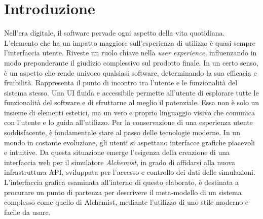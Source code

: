 \chapter{Introduzione}\label{chap:introduction}
Nell'era digitale, il software pervade ogni aspetto della vita quotidiana. L'elemento che ha un impatto maggiore sull'esperienza di utilizzo è quasi sempre l'interfaccia utente. Riveste un ruolo chiave nella \textit{user experience},  influenzando in modo preponderante il giudizio complessivo sul prodotto finale. In un certo senso, è un aspetto che rende univoco qualsiasi software, determinando la sua efficacia e fruibilità. Rappresenta il punto di incontro tra l'utente e le funzionalità del sistema stesso. Una \ac{UI} fluida e accessibile permette all'utente di esplorare tutte le funzionalità del software e di sfruttarne al meglio il potenziale. Essa non è solo un insieme di elementi estetici, ma un vero e proprio linguaggio visivo che comunica con l'utente e lo guida all'utilizzo.
\newline 
Per la conservazione di una esperienza utente soddisfacente, è fondamentale stare al passo delle tecnologie moderne. In un mondo in costante evoluzione, gli utenti si aspettano interfacce grafiche piacevoli e intuitive.
Da questa situazione emerge l'esigenza della creazione di una interfaccia web per il simulatore \textit{Alchemist}, in grado di affidarsi alla nuova infrastruttura \ac{API}, sviluppata per l'accesso e controllo dei dati delle simulazioni. L'interfaccia grafica esaminata all'interno di questo elaborato, è destinata a procurare un punto di partenza per descrivere il meta-modello di un sistema complesso come quello di Alchemist, mediante l'utilizzo di uno stile moderno e facile da usare.
